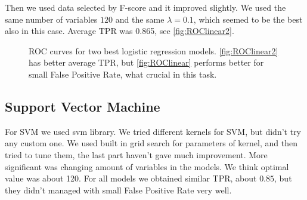 \documentclass[]{article}
\begin{document}
Then we used data selected by F-score and it improved slightly. We used the same number of variables $120$ and the same $\lambda = 0.1$, which seemed to be the best also in this case. Average TPR was 0.865, see \ref{fig:ROClinear2}.
  \begin{figure}[h]
    \center
    \caption{ROC curves for two best logistic regression models. \ref{fig:ROClinear2} has better average TPR, but \ref{fig:ROClinear} performs better for small False Positive Rate, what crucial in this task.}
  \end{figure}

\subsection{Support Vector Machine}

For SVM we used svm library. %
We tried different kernels for SVM, but didn't try any custom one. We used built in grid search for parameters of kernel, and then tried to tune them, the last part haven't gave much improvement. More significant was changing amount of variables in the models. We think optimal value was about 120. For all models we obtained similar TPR, about $0.85$, but they didn't managed with small False Positive Rate very well.
\end{document}
